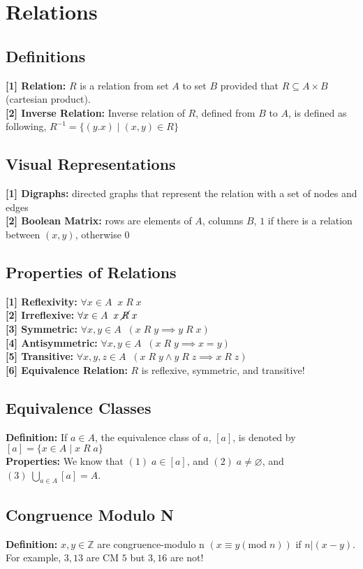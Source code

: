
\section{Relations}
\subsection{Definitions}
\textbf{[1] Relation:} $R$ is a relation from set $A$ to set $B$ provided that $R \subseteq A \times B$ (cartesian product).\\
\textbf{[2] Inverse Relation:} Inverse relation of $R$, defined from $B$ to $A$, is defined as following, $R^{-1} = \{(y.x)\;|\;(x,y) \in R\}$
\subsection{Visual Representations}
\textbf{[1] Digraphs:} directed graphs that represent the relation with a set of nodes and edges\\
\textbf{[2] Boolean Matrix:} rows are elements of $A$, columns $B$, $1$ if there is a relation between $(x,y)$, otherwise $0$
\subsection{Properties of Relations}
\textbf{[1] Reflexivity:} $\forall x \in A\;\;x\;R\;x$ \\
\textbf{[2] Irreflexive:} $\forall x \in A\;\;x\;\cancel{R}\;x$\\
\textbf{[3] Symmetric:} $\forall x,y \in A\;\;(x\;R\;y \implies y\;R\;x)$\\
\textbf{[4] Antisymmetric:} $\forall x,y \in A\;\;(x\;R\;y \implies x = y)$\\
\textbf{[5] Transitive:} $\forall x,y,z \in A\;\;(x\;R\;y \wedge y\;R\;z \implies x\;R\;z)$\\
\textbf{[6] Equivalence Relation:} $R$ is reflexive, symmetric, and transitive!
\subsection{Equivalence Classes}
\textbf{Definition:} If $a \in A$, the equivalence class of $a$, $[a]$, is denoted by $[a] = \{x \in A\;|\;x\;R\;a\}$\\
\textbf{Properties:} We know that $(1)\;a \in [a]$, and $(2)\;a \neq \varnothing$, and $(3)\;\bigcup_{a \in A} [a] = A$.
\subsection{Congruence Modulo N}
\textbf{Definition:} $x,y \in \mathbb{Z}$ are congruence-modulo n $(x \equiv y(\text{mod}\;n))$ if $n|(x-y)$. For example, $3,13$ are CM $5$ but $3,16$ are not!
